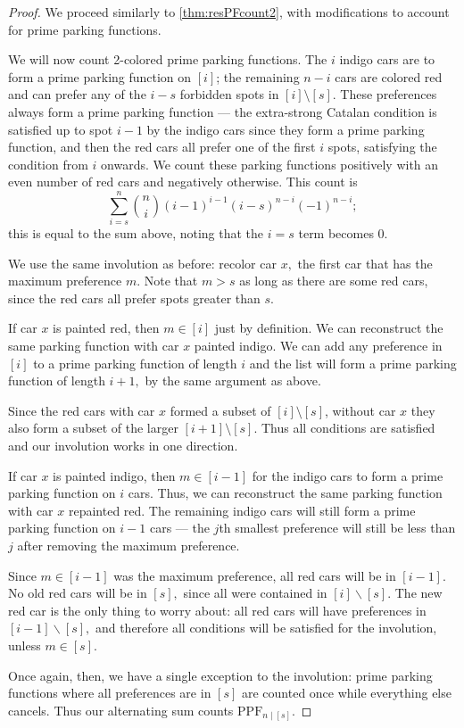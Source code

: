 \documentclass[12pt]{article}
\begin{document}
\begin{proof}
    We proceed similarly to \cref{thm:resPFcount2}, with modifications to account for prime parking functions.
    
    We will now count 2-colored prime parking functions. The $i$ indigo cars are to form a prime parking function on $[i]$; the remaining $n - i$ cars are colored red and can prefer any of the $i - s$ forbidden spots in  $[i] \setminus [s]$. These preferences always form a prime parking function --- the extra-strong Catalan condition is satisfied up to spot $i-1$ by the indigo cars since they form a prime parking function, and then the red cars all prefer one of the first $i$ spots, satisfying the condition from $i$ onwards. We count these parking functions positively with an even number of red cars and negatively otherwise. This count is
	\[
		\sum_{i = s}^{n} \binom{n}{i} (i - 1)^{i - 1} (i - s)^{n - i} (-1)^{n - i};
	\]
	this is equal to the sum above, noting that the $i=s$ term becomes 0.

	We use the same involution as before: recolor car $x,$ the first car that has the maximum preference $m.$ Note that $m > s$ as long as there are some red cars, since the red cars all prefer spots greater than $s$.

	If car $x$ is painted red, then  $m \in [i]$ just by definition. We can reconstruct the same parking function with car $x$ painted indigo. We can add any preference in $[i]$ to a prime parking function of length $i$ and the list will form a prime parking function of length $i + 1,$ by the same argument as above.
    
    Since the red cars with car $x$ formed a subset of $[i] \setminus [s]$, without car $x$ they also form a subset of the larger $[i + 1] \setminus [s]$. Thus all conditions are satisfied and our involution works in one direction.

	If car $x$ is painted indigo, then $m\in [i-1]$ for the indigo cars to form a prime parking function on $i$ cars. Thus, we can reconstruct the same parking function with car $x$ repainted red. The remaining indigo cars will still form a prime parking function on $i - 1$ cars --- the $j$th smallest preference will still be less than $j$ after removing the maximum preference.
    
    Since $m\in [i-1]$ was the maximum preference, all red cars will be in $[i-1]$. No old red cars will be in $[s],$ since all were contained in $[i]\backslash [s].$ The new red car is the only thing to worry about: all red cars will have preferences in $[i-1]\backslash [s],$ and therefore all conditions will be satisfied for the involution, unless $m\in [s].$

	Once again, then, we have a single exception to the involution: prime parking functions where all preferences are in $[s]$ are counted once while everything else cancels. Thus our alternating sum counts $\mathrm{PPF}_{n \mid [s]}$.
\end{proof}
\end{document}
